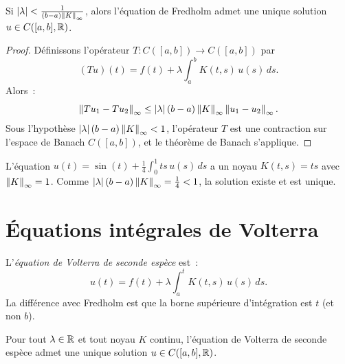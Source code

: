 \begin{theoreme}
\label{thm:fredholm}
Si $\left| \lambda \right| < \frac{1}{(b-a) \left\| K \right\|_\infty}$, alors l'\'equation de Fredholm
admet une unique solution $u \in C([a,b], \mathbb{R})$.
\end{theoreme}

\begin{proof}
D\'efinissons l'op\'erateur $T\colon C([a,b]) \to C([a,b])$ par
\[
  (Tu)(t) = f(t) + \lambda \int_a^b K(t,s) \, u(s) \, ds.
\]
Alors~:
\[
  \left\| Tu_1 - Tu_2 \right\|_\infty \leq \left| \lambda \right| (b-a) \left\| K \right\|_\infty \left\| u_1 - u_2 \right\|_\infty.
\]
Sous l'hypoth\`ese $\left| \lambda \right| (b-a) \left\| K \right\|_\infty < 1$, l'op\'erateur $T$ est une
contraction sur l'espace de Banach $C([a,b])$, et le th\'eor\`eme de Banach s'applique.
\end{proof}

\begin{exemple}
L'\'equation $u(t) = \sin(t) + \frac{1}{4} \int_0^1 ts \, u(s) \, ds$ a un noyau
$K(t,s) = ts$ avec $\left\| K \right\|_\infty = 1$. Comme $\left| \lambda \right|(b-a)\left\| K \right\|_\infty
= \frac{1}{4} < 1$, la solution existe et est unique.
\end{exemple}

\section{\'Equations int\'egrales de Volterra}

\begin{definition}
L'\emph{\'equation de Volterra de seconde esp\`ece} est~:
\[
  u(t) = f(t) + \lambda \int_a^t K(t,s) \, u(s) \, ds.
\]
La diff\'erence avec Fredholm est que la borne sup\'erieure d'int\'egration est $t$
(et non $b$).
\end{definition}

\begin{theoreme}
\label{thm:volterra}
Pour tout $\lambda \in \mathbb{R}$ et tout noyau $K$ continu, l'\'equation de Volterra de seconde
esp\`ece admet une unique solution $u \in C([a,b], \mathbb{R})$.
\end{theoreme}

